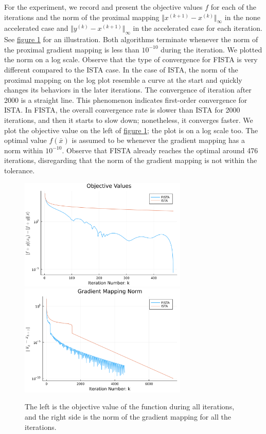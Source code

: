 \documentclass[]{article}
\theoremstyle{definition}
\begin{document}
        For the experiment, we record and present the objective values $f$ for each of the iterations and the norm of the proximal mapping $\Vert x^{(k + 1)} - x^{(k)}\Vert_\infty$ in the none accelerated case and $\Vert y^{(k)} - x^{(k + 1)}\Vert_\infty$ in the accelerated case for each iteration. See \hyperref[fig:lasso_1]{figure \ref*{fig:lasso_1}} for an illustration. Both algorithms terminate whenever the norm of the proximal gradient mapping is less than $10^{-10}$ during the iteration. We plotted the norm on a log scale. Observe that the type of convergence for FISTA is very different compared to the ISTA case. In the case of ISTA, the norm of the proximal mapping on the log plot resemble a curve at the start and quickly changes its behaviors in the later iterations. The convergence of iteration after 2000 is a straight line. This phenomenon indicates first-order convergence for ISTA. In FISTA, the overall convergence rate is slower than ISTA for 2000 iterations, and then it starts to slow down; nonetheless, it converges faster. We plot the objective value on the left of \hyperref[fig:lasso_1]{figure \ref*{fig:lasso_1}}; the plot is on a log scale too. The optimal value $f(\bar x)$ is assumed to be whenever the gradient mapping has a norm within $10^{-10}$. Observe that FISTA already reaches the optimal around 476 iterations, disregarding that the norm of the gradient mapping is not within the tolerance. 
        \begin{figure}[h]
            \centering
            \includegraphics*[width=8cm]{simple_lass_obj.png}
                \includegraphics*[width=8cm]{simple_lass_pgrad.png}
            \caption{The left is the objective value of the function during all iterations, and the right side is the norm of the gradient mapping for all the iterations. }
            \label{fig:lasso_1}
        \end{figure}
\end{document}
